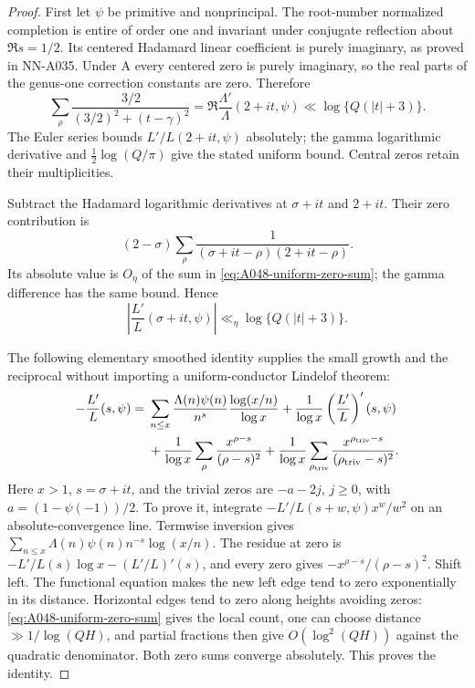\begin{proof}
First let \(\psi\) be primitive and nonprincipal.
The root-number normalized completion is entire of order
one and invariant under conjugate reflection about
\(\Re s=1/2\). Its centered Hadamard linear coefficient
is purely imaginary, as proved in NN-A035. Under A every
centered zero is purely imaginary, so the real parts of
the genus-one correction constants are zero. Therefore
\begin{equation}\label{eq:A048-uniform-zero-sum}
 \sum_\rho\frac{3/2}{(3/2)^2+(t-\gamma)^2}
 =\Re\frac{\Lambda'}{\Lambda}(2+it,\psi)
 \ll\log\{Q(|t|+3)\}.
\end{equation}
The Euler series bounds \(L'/L(2+it,\psi)\) absolutely;
the gamma logarithmic derivative and
\(\frac12\log(Q/\pi)\) give the stated uniform bound.
Central zeros retain their multiplicities.

Subtract the Hadamard logarithmic derivatives at
\(\sigma+it\) and \(2+it\). Their zero contribution is
\[
 (2-\sigma)\sum_\rho
       \frac1{(\sigma+it-\rho)(2+it-\rho)}.
\]
Its absolute value is \(O_\eta\) of the sum in
\eqref{eq:A048-uniform-zero-sum}; the gamma difference
has the same bound. Hence
\begin{equation}\label{eq:A048-logderiv}
 \left|\frac{L'}L(\sigma+it,\psi)\right|
       \ll_\eta\log\{Q(|t|+3)\}.
\end{equation}

The following elementary smoothed identity supplies the
small growth and the reciprocal without importing a
uniform-conductor Lindelof theorem:
\begin{align}
 -\frac{L'}L(s,\psi)
 ={}&\sum_{n\le x}\frac{\Lambda(n)\psi(n)}{n^s}
                    \frac{\log(x/n)}{\log x}
       +\frac1{\log x}\left(\frac{L'}L\right)'(s,\psi)
       \nonumber\\
 &+\frac1{\log x}\sum_\rho
                  \frac{x^{\rho-s}}{(\rho-s)^2}
       +\frac1{\log x}\sum_{\rho_{\rm triv}}
                  \frac{x^{\rho_{\rm triv}-s}}
                       {(\rho_{\rm triv}-s)^2}.
 \label{eq:A048-smoothed-log}
\end{align}
Here \(x>1\), \(s=\sigma+it\), and the trivial zeros are
\(-a-2j\), \(j\ge0\), with \(a=(1-\psi(-1))/2\).
To prove it, integrate
\(-L'/L(s+w,\psi)x^w/w^2\) on an absolute-convergence
line. Termwise inversion gives
\(\sum_{n\le x}\Lambda(n)\psi(n)n^{-s}\log(x/n)\).
The residue at zero is
\(-L'/L(s)\log x-(L'/L)'(s)\), and every zero gives
\(-x^{\rho-s}/(\rho-s)^2\).
Shift left. The functional equation makes the new
left edge tend to zero exponentially in its distance.
Horizontal edges tend to zero along heights avoiding
zeros: \eqref{eq:A048-uniform-zero-sum} gives the local
count, one can choose distance \(\gg1/\log(QH)\), and
partial fractions then give \(O(\log^2(QH))\) against
the quadratic denominator. Both zero sums converge
absolutely. This proves the identity.


\end{proof}
